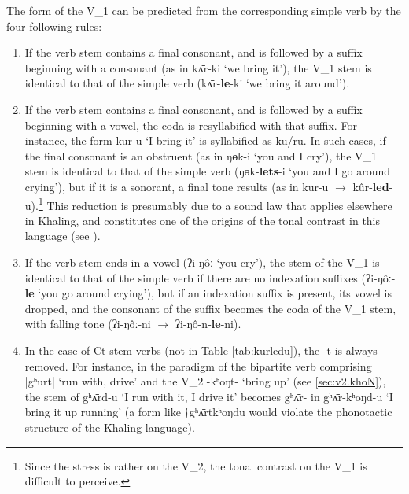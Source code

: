 \documentclass[oneside,a4paper,11pt]{article}
\newcommand{\ipa}[1]{{\phon#1}}
\newcommand{\dhatu}[2]{|\ipa{#1}| `#2'}
\begin{document}
  
The form of the V_1 can be predicted from the corresponding simple verb by the four following rules:

\begin{enumerate}
\item If the verb stem contains a final consonant, and is followed by a suffix beginning with a  consonant (as in \ipa{kʌ̄r-ki} `we bring it'), the V_1 stem is identical to that of the simple verb (\ipa{kʌ̄r-\textbf{le}-ki} `we bring it around').
\item If the verb stem contains a final consonant, and is followed by a suffix beginning with a  vowel, the coda is resyllabified with that suffix. For instance, the form \ipa{kur-u} `I bring it' is syllabified as \ipa{ku/ru}. In such cases, if the final consonant is an obstruent (as in \ipa{ŋɵk-i} `you and I cry'), the V_1 stem is identical to that of the simple verb (\ipa{ŋɵk-\textbf{lets}-i} `you and I go around crying'), but if it is a sonorant, a final tone results (as in \ipa{kur-u} $\rightarrow$   \ipa{kûr-\textbf{led}-u}).\footnote{Since the stress is rather on the V_2, the tonal contrast on the V_1 is difficult to perceive.} This reduction is presumably due to a sound law that applies elsewhere in Khaling, and constitutes one of the origins of the tonal contrast in this language (see \citealt{jacques16tonogenesis}).
\item If the verb stem ends in a vowel (\ipa{ʔi-ŋôː} `you cry'), the stem of the V_1 is identical to that of the simple verb if there are no indexation suffixes (\ipa{ʔi-ŋôː-\textbf{le}} `you go around crying'), but if an indexation suffix is present, its vowel is dropped, and the consonant of the suffix becomes the coda of the V_1 stem, with falling tone (\ipa{ʔi-ŋôː-ni}   $\rightarrow$ \ipa{ʔi-ŋô-n-\textbf{le}-ni}).
\item In the case of Ct stem verbs (not in Table \ref{tab:kurledu}), the \ipa{-t} is always removed. For instance, in the paradigm of the bipartite verb comprising \dhatu{gʰurt}{run with, drive} and the V_2 \ipa{-kʰoŋt-} `bring up' (see \ref{sec:v2.khoN}), the stem of \ipa{gʰʌ̄rd-u} `I run with it, I drive it' becomes \ipa{gʰʌ̄r-} in \ipa{gʰʌ̄r-kʰoŋd-u} `I bring it up running' (a form like $\dagger$\ipa{gʰʌ̄rtkʰoŋdu} would violate the phonotactic structure of the Khaling language).
\end{enumerate}
\end{document}
